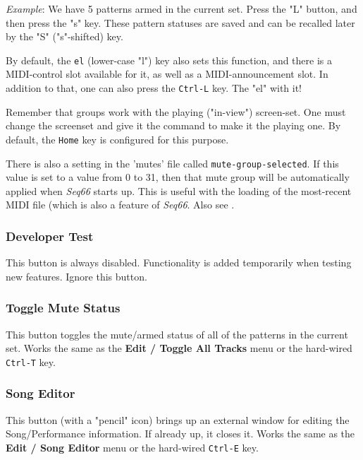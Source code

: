    \textsl{Example}:
   We have 5 patterns armed in the current set. Press the "L" button,
   and then press the "s" key.  These pattern statuses are saved and can be
   recalled later by the "S" ("s"-shifted) key.

   By default, the \texttt{el} (lower-case "l") key also sets this function,
   and there is a MIDI-control slot available for it, as well as a
   MIDI-announcement slot.
   In addition to that, one can also press
   the \texttt{Ctrl-L} key.
   The "el" with it!

   Remember that groups work with the playing ("in-view") screen-set.
   One must change the screenset and give it the command to make it the
   playing one.
   By default, the \texttt{Home} key is configured for this purpose.

   There is also a setting in the 'mutes' file called
   \texttt{mute-group-selected}.  If this value is set to a value from 0 to 31,
   then that mute group will be automatically applied when
   \textsl{Seq66} starts up.
   This is useful with the loading of the most-recent MIDI file (which is also
   a feature of \textsl{Seq66}.
   Also see .

\subsubsection{Developer Test}
\label{subsubsec:introduction_developer_test_button}

   This button is always disabled.  Functionality is added temporarily when
   testing new features. Ignore this button.

\subsubsection{Toggle Mute Status}
\label{subsubsec:introduction_toggle_mute_status_button}

   This button toggles the mute/armed status of all of the patterns
   in the current set.
   Works the same as the
   \textbf{Edit / Toggle All Tracks} menu or the hard-wired
   \texttt{Ctrl-T} key.

\subsubsection{Song Editor}
\label{subsubsec:introduction_song_editor_button}

   This button (with a "pencil" icon)
   brings up an external window for editing the Song/Performance
   information.  If already up, it closes it.
   Works the same as the
   \textbf{Edit / Song Editor} menu or the hard-wired \texttt{Ctrl-E} key.

